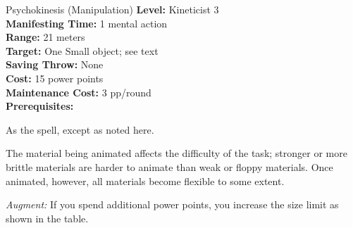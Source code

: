 {Psychokinesis (Manipulation)}
{
	\textbf{Level:}
	Kineticist 3\\
	\textbf{Manifesting Time:}
	1 mental action\\
	\textbf{Range:}
	21 meters\\
	\textbf{Target:}
	One Small object; see text\\
	\textbf{Saving Throw:}
	None\\
	\textbf{Cost:}
	15 power points\\
	\textbf{Maintenance Cost:}
	3 pp/round\\
	\textbf{Prerequisites:}
	\\
}
{
	As the  spell, except as noted here.

	The material being animated affects the difficulty of the task; stronger or more brittle materials are harder to animate than weak or floppy materials. Once animated, however, all materials become flexible to some extent.


	\textit{Augment:} If you spend additional power points, you increase the size limit as shown in the table.
}
